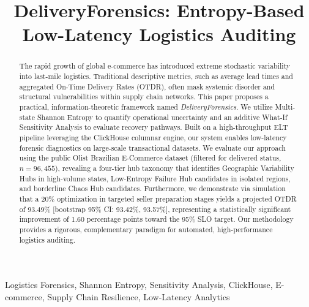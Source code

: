 \documentclass[conference]{IEEEtran}
\begin{document}
\title{DeliveryForensics: Entropy-Based Low-Latency Logistics Auditing}

\author{
}

\maketitle

\begin{abstract}
The rapid growth of global e-commerce has introduced extreme stochastic variability into last-mile logistics. Traditional descriptive metrics, such as average lead times and aggregated On-Time Delivery Rates (OTDR), often mask systemic disorder and structural vulnerabilities within supply chain networks. This paper proposes a practical, information-theoretic framework named \textit{DeliveryForensics}. We utilize Multi-state Shannon Entropy to quantify operational uncertainty and an additive What-If Sensitivity Analysis to evaluate recovery pathways. Built on a high-throughput ELT pipeline leveraging the ClickHouse columnar engine, our system enables low-latency forensic diagnostics on large-scale transactional datasets. We evaluate our approach using the public Olist Brazilian E-Commerce dataset (filtered for delivered status, $n=96,455$), revealing a four-tier hub taxonomy that identifies Geographic Variability Hubs in high-volume states, Low-Entropy Failure Hub candidates in isolated regions, and borderline Chaos Hub candidates. Furthermore, we demonstrate via simulation that a 20\% optimization in targeted seller preparation stages yields a projected OTDR of 93.49\% [bootstrap 95\% CI: 93.42\%, 93.57\%], representing a statistically significant improvement of 1.60 percentage points toward the 95\% SLO target. Our methodology provides a rigorous, complementary paradigm for automated, high-performance logistics auditing.
\end{abstract}

\begin{IEEEkeywords}
Logistics Forensics, Shannon Entropy, Sensitivity Analysis, ClickHouse, E-commerce, Supply Chain Resilience, Low-Latency Analytics
\end{IEEEkeywords}
\end{document}

